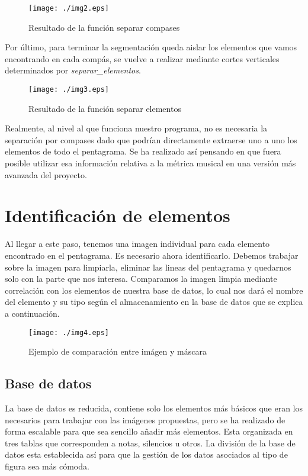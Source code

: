 \documentclass[10pt, a4paper]{article}
\begin{document}
\begin{figure}[h!]
  \centering
    \texttt{[image: ./img2.eps]}
  \caption{Resultado de la función separar compases}
  \label{fig1}
\end{figure}


 Por último, para terminar la segmentación queda aislar los elementos que vamos encontrando en cada compás, se vuelve a realizar mediante cortes verticales determinados por \emph{separar\_elementos}.
 

\begin{figure}[h!]
  \centering
    \texttt{[image: ./img3.eps]}
  \caption{Resultado de la función separar elementos}
  \label{fig1}
\end{figure}

Realmente, al nivel al que funciona nuestro programa, no es necesaria la separación por compases dado que podrían directamente extraerse uno a uno los elementos de todo el pentagrama. Se ha realizado así pensando en que fuera posible utilizar esa información relativa a la métrica musical en una versión más avanzada del proyecto.

\section{Identificación de elementos}

Al llegar a este paso, tenemos una imagen individual para cada elemento encontrado en el pentagrama. Es necesario ahora identificarlo. Debemos trabajar sobre la imagen para limpiarla, eliminar las lineas del pentagrama y quedarnos solo con la parte que nos interesa. Comparamos la imagen limpia mediante correlación con los elementos de nuestra base de datos, lo cual nos dará el nombre del elemento y su
tipo según el almacenamiento en la base de datos que se explica a continuación.

\begin{figure}[h!]
  \centering
    \texttt{[image: ./img4.eps]}
  \caption{Ejemplo de comparación entre imágen y máscara}
  \label{fig1}
\end{figure}

\subsection*{Base de datos}

La base de datos es reducida, contiene solo los elementos más básicos que eran los necesarios para trabajar con las imágenes propuestas, pero se ha realizado de forma escalable para que sea sencillo añadir más elementos. Esta organizada en tres tablas que corresponden a notas, silencios u otros. La división de la base de datos esta establecida así para que la gestión de los datos asociados al tipo de figura sea más cómoda. 
\end{document}
